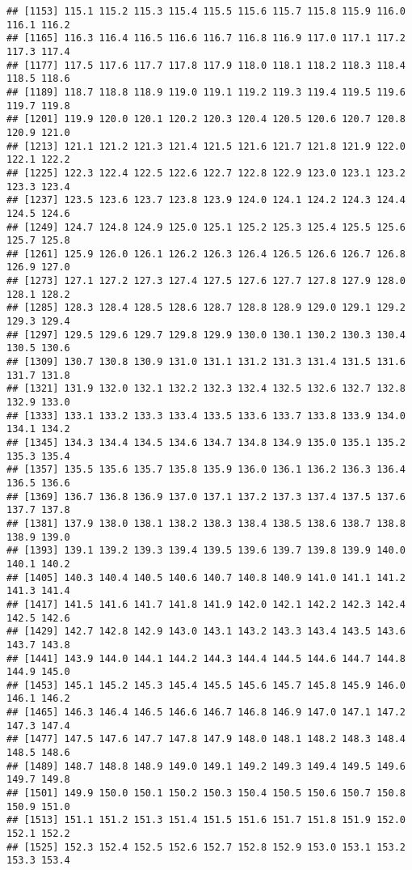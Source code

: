 \documentclass[
]{article}
\begin{document}
\begin{verbatim}
## [1153] 115.1 115.2 115.3 115.4 115.5 115.6 115.7 115.8 115.9 116.0 116.1 116.2
## [1165] 116.3 116.4 116.5 116.6 116.7 116.8 116.9 117.0 117.1 117.2 117.3 117.4
## [1177] 117.5 117.6 117.7 117.8 117.9 118.0 118.1 118.2 118.3 118.4 118.5 118.6
## [1189] 118.7 118.8 118.9 119.0 119.1 119.2 119.3 119.4 119.5 119.6 119.7 119.8
## [1201] 119.9 120.0 120.1 120.2 120.3 120.4 120.5 120.6 120.7 120.8 120.9 121.0
## [1213] 121.1 121.2 121.3 121.4 121.5 121.6 121.7 121.8 121.9 122.0 122.1 122.2
## [1225] 122.3 122.4 122.5 122.6 122.7 122.8 122.9 123.0 123.1 123.2 123.3 123.4
## [1237] 123.5 123.6 123.7 123.8 123.9 124.0 124.1 124.2 124.3 124.4 124.5 124.6
## [1249] 124.7 124.8 124.9 125.0 125.1 125.2 125.3 125.4 125.5 125.6 125.7 125.8
## [1261] 125.9 126.0 126.1 126.2 126.3 126.4 126.5 126.6 126.7 126.8 126.9 127.0
## [1273] 127.1 127.2 127.3 127.4 127.5 127.6 127.7 127.8 127.9 128.0 128.1 128.2
## [1285] 128.3 128.4 128.5 128.6 128.7 128.8 128.9 129.0 129.1 129.2 129.3 129.4
## [1297] 129.5 129.6 129.7 129.8 129.9 130.0 130.1 130.2 130.3 130.4 130.5 130.6
## [1309] 130.7 130.8 130.9 131.0 131.1 131.2 131.3 131.4 131.5 131.6 131.7 131.8
## [1321] 131.9 132.0 132.1 132.2 132.3 132.4 132.5 132.6 132.7 132.8 132.9 133.0
## [1333] 133.1 133.2 133.3 133.4 133.5 133.6 133.7 133.8 133.9 134.0 134.1 134.2
## [1345] 134.3 134.4 134.5 134.6 134.7 134.8 134.9 135.0 135.1 135.2 135.3 135.4
## [1357] 135.5 135.6 135.7 135.8 135.9 136.0 136.1 136.2 136.3 136.4 136.5 136.6
## [1369] 136.7 136.8 136.9 137.0 137.1 137.2 137.3 137.4 137.5 137.6 137.7 137.8
## [1381] 137.9 138.0 138.1 138.2 138.3 138.4 138.5 138.6 138.7 138.8 138.9 139.0
## [1393] 139.1 139.2 139.3 139.4 139.5 139.6 139.7 139.8 139.9 140.0 140.1 140.2
## [1405] 140.3 140.4 140.5 140.6 140.7 140.8 140.9 141.0 141.1 141.2 141.3 141.4
## [1417] 141.5 141.6 141.7 141.8 141.9 142.0 142.1 142.2 142.3 142.4 142.5 142.6
## [1429] 142.7 142.8 142.9 143.0 143.1 143.2 143.3 143.4 143.5 143.6 143.7 143.8
## [1441] 143.9 144.0 144.1 144.2 144.3 144.4 144.5 144.6 144.7 144.8 144.9 145.0
## [1453] 145.1 145.2 145.3 145.4 145.5 145.6 145.7 145.8 145.9 146.0 146.1 146.2
## [1465] 146.3 146.4 146.5 146.6 146.7 146.8 146.9 147.0 147.1 147.2 147.3 147.4
## [1477] 147.5 147.6 147.7 147.8 147.9 148.0 148.1 148.2 148.3 148.4 148.5 148.6
## [1489] 148.7 148.8 148.9 149.0 149.1 149.2 149.3 149.4 149.5 149.6 149.7 149.8
## [1501] 149.9 150.0 150.1 150.2 150.3 150.4 150.5 150.6 150.7 150.8 150.9 151.0
## [1513] 151.1 151.2 151.3 151.4 151.5 151.6 151.7 151.8 151.9 152.0 152.1 152.2
## [1525] 152.3 152.4 152.5 152.6 152.7 152.8 152.9 153.0 153.1 153.2 153.3 153.4

\end{verbatim}
\end{document}
